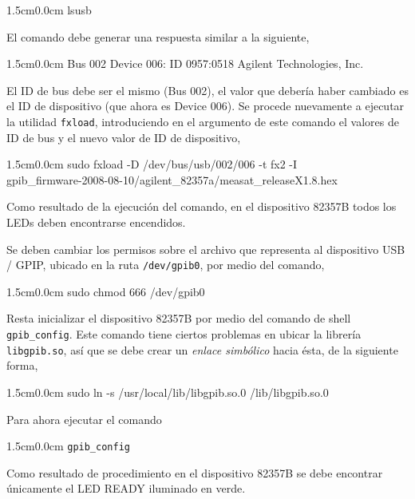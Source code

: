\documentclass[paper=letter,oneside,fontsize=11pt, parskip=full]{scrartcl}
\newenvironment{code}
	{\begin{adjustwidth}{1.5cm}{0.0cm}\ttfamily}
	{\end{adjustwidth}}
\begin{document}
		\begin{code}
			lsusb
		\end{code}
	
		El comando debe generar una respuesta similar a la siguiente,
		
		\begin{code}
			Bus 002 Device 006: ID 0957:0518 Agilent Technologies, Inc.
		\end{code}
		
		El ID de bus debe ser el mismo (Bus 002), el valor que debería haber cambiado es el ID de dispositivo (que ahora es Device 006). Se procede nuevamente a ejecutar la utilidad \texttt{fxload}, introduciendo en el argumento de este comando el valores de ID de bus y el nuevo valor de ID de dispositivo,
		
		\begin{code}
			sudo fxload -D /dev/bus/usb/002/006  -t fx2 -I \\ gpib\_firmware-2008-08-10/agilent\_82357a/measat\_releaseX1.8.hex
		\end{code}
		
		Como resultado de la ejecución del comando, en el dispositivo 82357B todos los LEDs deben encontrarse encendidos.		
		
		Se deben cambiar los permisos sobre el archivo que representa al dispositivo USB / GPIP, ubicado en la ruta \texttt{/dev/gpib0}, por medio del comando,
		
		\begin{code}
			sudo chmod 666 /dev/gpib0
		\end{code}
		
		Resta inicializar el dispositivo 82357B por medio del comando de shell \texttt{gpib\_config}. Este comando tiene ciertos problemas en ubicar la librería \texttt{libgpib.so}, así que se debe crear un \emph{enlace simbólico} hacia ésta, de la siguiente forma,
		
		\begin{code}
			sudo ln -s /usr/local/lib/libgpib.so.0 /lib/libgpib.so.0
		\end{code}
		
		Para ahora ejecutar el comando
			
		\begin{code}
			\texttt{gpib\_config}
		\end{code}
	
		Como resultado de procedimiento en el dispositivo 82357B se debe encontrar únicamente el LED READY iluminado en verde.
		
\end{document}
